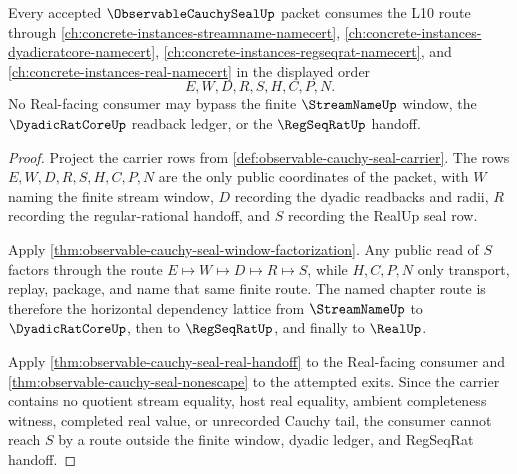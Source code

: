 \begin{theorem}
\label{thm:observable-cauchy-seal-l10-dependency-lattice}
Every accepted $\ObservableCauchySealUp$ packet consumes the L10 route through \autoref{ch:concrete-instances-streamname-namecert}, \autoref{ch:concrete-instances-dyadicratcore-namecert}, \autoref{ch:concrete-instances-regseqrat-namecert}, and \autoref{ch:concrete-instances-real-namecert} in the displayed order
$$
E,W,D,R,S,H,C,P,N.
$$
No Real-facing consumer may bypass the finite $\StreamNameUp$ window, the $\DyadicRatCoreUp$ readback ledger, or the $\RegSeqRatUp$ handoff.
\end{theorem}
\begin{proof}
Project the carrier rows from \autoref{def:observable-cauchy-seal-carrier}. The rows $E,W,D,R,S,H,C,P,N$ are the only public coordinates of the packet, with $W$ naming the finite stream window, $D$ recording the dyadic readbacks and radii, $R$ recording the regular-rational handoff, and $S$ recording the RealUp seal row.

Apply \autoref{thm:observable-cauchy-seal-window-factorization}. Any public read of $S$ factors through the route $E \longmapsto W \longmapsto D \longmapsto R \longmapsto S$, while $H,C,P,N$ only transport, replay, package, and name that same finite route. The named chapter route is therefore the horizontal dependency lattice from $\StreamNameUp$ to $\DyadicRatCoreUp$, then to $\RegSeqRatUp$, and finally to $\RealUp$.

Apply \autoref{thm:observable-cauchy-seal-real-handoff} to the Real-facing consumer and \autoref{thm:observable-cauchy-seal-nonescape} to the attempted exits. Since the carrier contains no quotient stream equality, host real equality, ambient completeness witness, completed real value, or unrecorded Cauchy tail, the consumer cannot reach $S$ by a route outside the finite window, dyadic ledger, and RegSeqRat handoff.
\end{proof}

